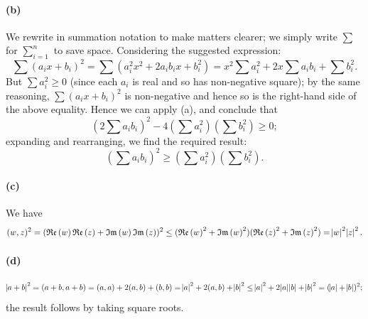 \documentclass[a4paper,10pt]{article}
\newcommand*\realp[1]{ \mathfrak{Re} \left ( {#1} \right )  }
\newcommand*\imagp[1]{ \mathfrak{Im} \left ( {#1} \right )  }
\begin{document}
\paragraph{(b)}
We rewrite in summation notation to make matters clearer; we simply write $ \sum $ for $ \sum_{i = 1}^n $ to save space. Considering
the suggested expression:
\begin{displaymath}
  \sum (a_i x + b_i)^2 = \sum (a_i^2 x^2 + 2a_i b_i x + b_i^2) = x^2 \sum a_i^2 + 2x \sum a_i b_i + \sum b_i^2.
\end{displaymath}
But $ \sum a_i^2 \geq 0 $ (since each $ a_i $ is real and so has non-negative square); by the same reasoning, $ \sum (a_i x + b_i)^2 $ is
non-negative and hence so is the right-hand side of the above equality. Hence we can apply (a), and conclude that
\begin{displaymath}
  \left(2\sum a_i b_i\right)^2 - 4\left(\sum a_i^2\right)\left(\sum b_i^2\right) \geq 0;
\end{displaymath}
expanding and rearranging, we find the required result:
\begin{displaymath}
  \left(\sum a_i b_i\right)^2 \geq \left(\sum a_i^2\right)\left(\sum b_i^2\right).
\end{displaymath}

\paragraph{(c)}
We have
\begin{displaymath}
  (w,z)^2 = (\realp{w}\realp{z} + \imagp{w}\imagp{z})^2 \leq (\realp{w}^2 + \imagp{w}^2)(\realp{z}^2 + \imagp{z}^2) = \abs{w}^2\abs{z}^2.
\end{displaymath}

\paragraph{(d)}
\begin{displaymath}
  \abs{a + b}^2 = (a + b, a + b) = (a,a) + 2(a,b) + (b,b) = \abs{a}^2 + 2(a,b) + \abs{b}^2 \leq \abs{a}^2 + 2\abs{a}\abs{b} + \abs{b}^2 = (\abs{a} + \abs{b})^2;
\end{displaymath}
the result follows by taking square roots.
\end{document}
